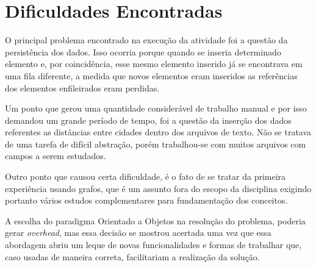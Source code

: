 \chapter*[Dificuldades Encontradas]{Dificuldades Encontradas}

O principal problema encontrado na execução da atividade foi a questão da persistência dos 
dados. Isso ocorria porque quando se inseria determinado elemento e, por coincidência, esse mesmo 
elemento inserido já se encontrava em uma fila diferente, a medida que novos elementos eram inseridos as referências dos elementos enfileirados eram perdidas.

Um ponto que gerou uma quantidade considerável de trabalho manual e por isso demandou um grande período de 
tempo, foi a questão da inserção dos dados referentes as distâncias entre cidades dentro dos arquivos de 
texto. Não se tratava de uma tarefa de difícil abstração, porém trabalhou-se com muitos arquivos com campos 
a serem estudados. 

Outro ponto que causou certa dificuldade, é o fato de se tratar da primeira experiência usando grafos,
que é um assunto fora do escopo da disciplina exigindo portanto vários estudos complementares para 
fundamentação dos conceitos. 

A escolha do paradigma Orientado a Objetos na resolução do problema, poderia gerar \textit{overhead}, mas essa decisão se mostrou acertada uma vez que essa abordagem abriu um leque de novas funcionalidades e 
formas de trabalhar que, caso usadas de maneira correta, facilitariam a realização da solução.
